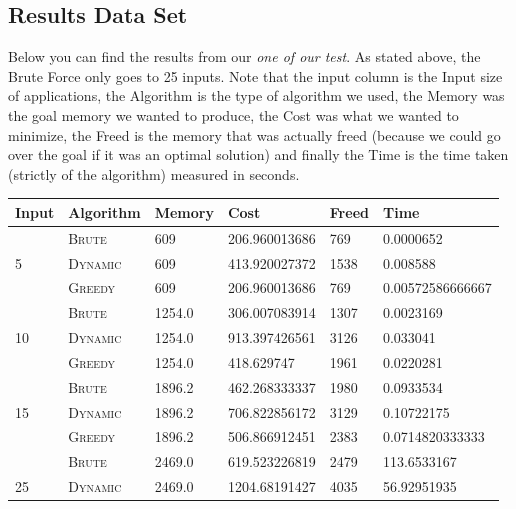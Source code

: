 \documentclass{article}
\begin{document}
\subsection{Results Data Set}
Below you can find the results from our \textit{one of our test}. As stated above, the Brute Force only goes to 25 inputs. Note that the input column is the Input size of applications, the Algorithm is the type of algorithm we used, the Memory was the goal memory we wanted to produce, the Cost was what we wanted to minimize, the Freed is the memory that was actually freed (because we could go over the goal if it was an optimal solution) and finally the Time is the time taken (strictly of the algorithm) measured in seconds.
\begin{adjustwidth}{-.5cm}{}
    \begin{center}
        \begin{tabular}{l|lllll} \toprule
 \textbf{Input} & \textbf{Algorithm} & \textbf{Memory} & \textbf{Cost} & \textbf{Freed} & \textbf{Time} \\ \hline
        & \textsc{Brute}   & 609       & 206.960013686    & 769      &  0.0000652            \\
5       & \textsc{Dynamic} & 609       & 413.920027372    & 1538     &  0.008588             \\
        & \textsc{Greedy}  & 609       & 206.960013686    & 769      &  0.00572586666667     \\ \midrule
        & \textsc{Brute}   & 1254.0    & 306.007083914    & 1307     &  0.0023169            \\
10      & \textsc{Dynamic} & 1254.0    & 913.397426561    & 3126     &  0.033041             \\
        & \textsc{Greedy}  & 1254.0    & 418.629747       & 1961     &  0.0220281            \\ \midrule
        & \textsc{Brute}   & 1896.2    & 462.268333337    & 1980     &  0.0933534            \\
15      & \textsc{Dynamic} & 1896.2    & 706.822856172    & 3129     &  0.10722175           \\
        & \textsc{Greedy}  & 1896.2    & 506.866912451    & 2383     &  0.0714820333333      \\ \midrule
        & \textsc{Brute}   & 2469.0    & 619.523226819    & 2479     &  113.6533167          \\
25      & \textsc{Dynamic} & 2469.0    & 1204.68191427    & 4035     &  56.92951935          \\

\end{tabular}
\end{center}
\end{adjustwidth}
\end{document}
